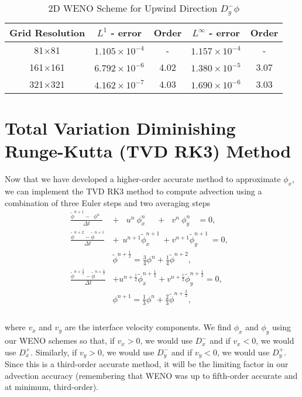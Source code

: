 \documentclass[oneside,12pt,final]{/Applications/TeX/packages/ucthesis-CA2012}
\begin{document}
\begin{mainmatter}
\begin{table} [!h]
\caption{2D WENO Scheme for Upwind Direction $D_y^- \phi$}
\label{table:2D_WENO_4}
\centering
\begin{tabular}{c c c c c}
\hline
Grid Resolution  & $L^1$ - error    & Order  & $L^\infty$ - error & Order \\ \hline
81$\times$81          & $1.105 \times 10^{-4}$  &   -    & $1.157 \times 10^{-4} $  &  -  \\
161$\times$161        & $6.792 \times 10^{-6}$  &  4.02  & $1.380 \times 10^{-5}$  & 3.07\\
321$\times$321        & $4.162 \times 10^{-7}$  &  4.03  & $1.690 \times 10^{-6}$   & 3.03\\
\end{tabular}
\end{table}


\section{Total Variation Diminishing Runge-Kutta (TVD RK3) Method}

Now that we have developed a higher-order accurate method to approximate $\phi_x$, we can implement the TVD RK3 method to compute advection using a combination of three Euler steps and two averaging steps 
\begin{equation}  
\begin{aligned}
\frac{\tilde{\phi}^{n+1} - \>\> \phi^n\>\>}{\Delta t} &+\>\>\>\> u^n \>\phi_x^n \>\>\>\>\>\> +\>\>\> v^n \>\phi_y^n \>\>\>\> = 0,\>\>\>\>  \\
\frac{\tilde{\phi}^{n+2} - \tilde{\phi}^{n+1}}{\Delta t} &+ \>\> u^{n+1} \tilde{\phi}_x^{n+1} \>+ v^{n+1} \tilde{\phi}_y^{n+1} \>= 0,\>\>\>  \\
&\tilde{\phi}^{n+\frac{1}{2}} = \frac{3}{4}\phi^{n} + \frac{1}{4} \tilde{\phi}^{n+2},\\
\frac{\tilde{\phi}^{n+\frac{3}{2}} - \tilde{\phi}^{n+\frac{1}{2}}}{\Delta t} &+ u^{n+\frac{1}{2}} \tilde{\phi}_x^{n+\frac{1}{2}} + v^{n+\frac{1}{2}} \tilde{\phi}_y^{n+\frac{1}{2}} = 0,\>\>\>\> \\
&\phi^{n+1} = \frac{1}{3}\phi^{n} + \frac{2}{3} \tilde{\phi}^{n+\frac{3}{2}}, \\
\end{aligned}
\end{equation}\\
where $v_x$ and $v_y$ are the interface velocity components. We find $\phi_x$ and $\phi_y$ using our WENO schemes so that, if $v_x > 0$, we would use $D_x^-$ and if $v_x < 0$, we would use $D_x^+$. Similarly, if $v_y > 0$, we would use $D_y^-$ and if $v_y < 0$, we would use $D_y^+$. Since this is a third-order accurate method, it will be the limiting factor in our advection accuracy (remembering that WENO was up to fifth-order accurate and at minimum, third-order).



\end{mainmatter}
\end{document}
